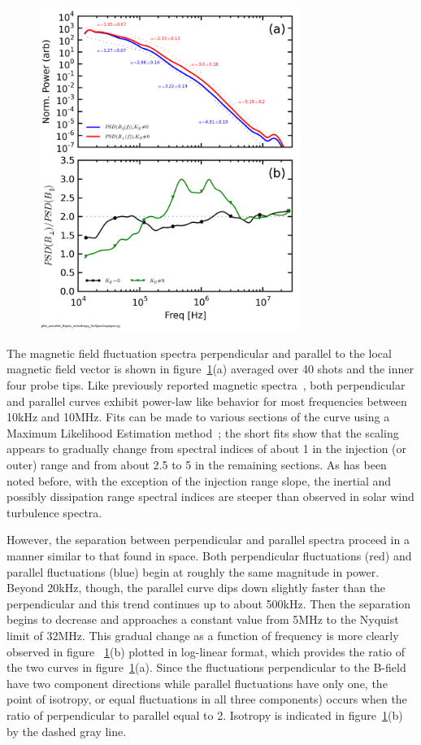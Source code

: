 \documentclass[aip,prl,amsmath,amssymb,reprint,superscriptaddress]{revtex4-1} %
\begin{document}
\begin{figure}[!htbp]
\centerline{
\includegraphics[width=8.5cm]{Bperppara_chan1t4_1mWbspectra_40t60us_wAsymRatio}}
\caption{\label{fig:spectra}}
\end{figure}

The magnetic field fluctuation spectra perpendicular and parallel to the local magnetic field vector is shown in figure~\ref{fig:spectra}(a) averaged over 40 shots and the inner four probe tips. Like previously reported magnetic spectra~\cite{schaffner14a}, both perpendicular and parallel curves exhibit power-law like behavior for most frequencies between 10kHz and 10MHz. Fits can be made to various sections of the curve using a Maximum Likelihood Estimation method~\cite{clauset09}; the short fits show that the scaling appears to gradually change from spectral indices of about 1 in the injection (or outer) range and from about 2.5 to 5 in the remaining sections. As has been noted before, with the exception of the injection range slope, the inertial and possibly dissipation range spectral indices are steeper than observed in solar wind turbulence spectra.

However, the separation between perpendicular and parallel spectra proceed in a manner similar to that found in space. Both perpendicular fluctuations (red) and parallel fluctuations (blue) begin at roughly the same magnitude in power. Beyond 20kHz, though, the parallel curve dips down slightly faster than the perpendicular and this trend continues up to about 500kHz. Then the separation begins to decrease and approaches a constant value from 5MHz to the Nyquist limit of 32MHz. This gradual change as a function of frequency is more clearly observed in figure ~\ref{fig:spectra}(b) plotted in log-linear format, which provides the ratio of the two curves in figure~\ref{fig:spectra}(a). Since the fluctuations perpendicular to the B-field have two component directions while parallel fluctuations have only one, the point of isotropy, or equal fluctuations in all three components) occurs when the ratio of perpendicular to parallel equal to 2. Isotropy is indicated in figure~\ref{fig:spectra}(b) by the dashed gray line.
\end{document}
